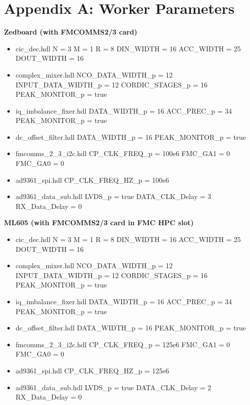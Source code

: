 \section{Appendix A: Worker Parameters}
\begin{minipage}[t]{.5\textwidth}
	\textbf{Zedboard (with FMCOMMS2/3 card)}
	\begin{itemize}
		\item cic\_dec.hdl
			\subitem N = 3
			\subitem M = 1
			\subitem R = 8
			\subitem DIN\_WIDTH = 16
			\subitem ACC\_WIDTH = 25
			\subitem DOUT\_WIDTH = 16
		\item complex\_mixer.hdl
			\subitem NCO\_DATA\_WIDTH\_p = 12
			\subitem INPUT\_DATA\_WIDTH\_p = 12
			\subitem CORDIC\_STAGES\_p = 16
			\subitem PEAK\_MONITOR\_p = true
		\item iq\_imbalance\_fixer.hdl
			\subitem DATA\_WIDTH\_p = 16
			\subitem ACC\_PREC\_p = 34
			\subitem PEAK\_MONITOR\_p = true
		\item dc\_offset\_filter.hdl
			\subitem DATA\_WIDTH\_p = 16
			\subitem PEAK\_MONITOR\_p = true
		\item fmcomms\_2\_3\_i2c.hdl
			\subitem CP\_CLK\_FREQ\_p = 100e6
			\subitem FMC\_GA1 = 0
			\subitem FMC\_GA0 = 0
		\item ad9361\_spi.hdl
			\subitem CP\_CLK\_FREQ\_HZ\_p = 100e6
		\item ad9361\_data\_sub.hdl
			\subitem LVDS\_p = true
			\subitem DATA\_CLK\_Delay = 3
			\subitem RX\_Data\_Delay = 0
	\end{itemize}
\end{minipage}
\begin{minipage}[t]{.5\textwidth}
	\textbf{ML605 (with FMCOMMS2/3 card in FMC HPC slot)}
	\begin{itemize}
		\item cic\_dec.hdl
			\subitem N = 3
			\subitem M = 1
			\subitem R = 8
			\subitem DIN\_WIDTH = 16
			\subitem ACC\_WIDTH = 25
			\subitem DOUT\_WIDTH = 16
		\item complex\_mixer.hdl
			\subitem NCO\_DATA\_WIDTH\_p = 12
			\subitem INPUT\_DATA\_WIDTH\_p = 12
			\subitem CORDIC\_STAGES\_p = 16
			\subitem PEAK\_MONITOR\_p = true
		\item iq\_imbalance\_fixer.hdl
			\subitem DATA\_WIDTH\_p = 16
			\subitem ACC\_PREC\_p = 34
			\subitem PEAK\_MONITOR\_p = true
		\item dc\_offset\_filter.hdl
			\subitem DATA\_WIDTH\_p = 16
			\subitem PEAK\_MONITOR\_p = true
		\item fmcomms\_2\_3\_i2c.hdl
			\subitem CP\_CLK\_FREQ\_p = 125e6
			\subitem FMC\_GA1 = 0
			\subitem FMC\_GA0 = 0
		\item ad9361\_spi.hdl
			\subitem CP\_CLK\_FREQ\_HZ\_p = 125e6
		\item ad9361\_data\_sub.hdl
			\subitem LVDS\_p = true
			\subitem DATA\_CLK\_Delay = 2
			\subitem RX\_Data\_Delay = 0
	\end{itemize}
\end{minipage}

